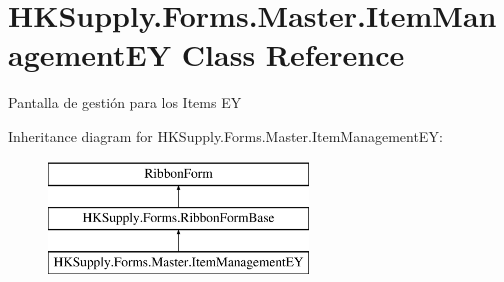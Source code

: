 \hypertarget{class_h_k_supply_1_1_forms_1_1_master_1_1_item_management_e_y}{}\section{H\+K\+Supply.\+Forms.\+Master.\+Item\+Management\+EY Class Reference}
\label{class_h_k_supply_1_1_forms_1_1_master_1_1_item_management_e_y}


Pantalla de gestión para los Items EY  


Inheritance diagram for H\+K\+Supply.\+Forms.\+Master.\+Item\+Management\+EY\+:\begin{figure}[H]
\begin{center}
\leavevmode
\includegraphics[height=3.000000cm]{class_h_k_supply_1_1_forms_1_1_master_1_1_item_management_e_y}
\end{center}
\end{figure}

